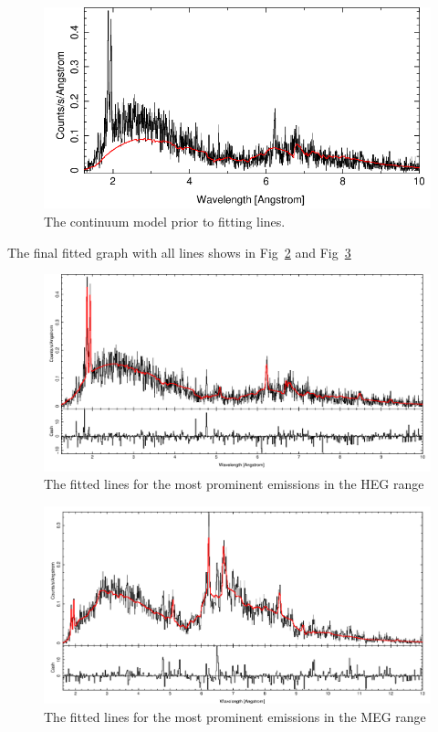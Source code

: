 \begin{figure}[h!]
    \centering
    \includegraphics[width=1\linewidth]{Chapters/Figures/unfitted.png}
    \caption{The continuum model prior to fitting lines.}
    \label{fig:continuum}
\end{figure}

The final fitted graph with all lines shows in Fig~\ref{fig:all_lines_1} and Fig~\ref{fig:all_lines_2}

\begin{figure}[h!]
    \centering
    \includegraphics[width=1\linewidth]{Chapters/Figures/all_lines_fitted_heg.png}
    \caption{The fitted lines for the most prominent emissions in the HEG range}
    \label{fig:all_lines_1}
\end{figure}

\begin{figure}[h!]
    \centering
    \includegraphics[width=1\linewidth]{Chapters/Figures/all_lines_fitted_meg.png}
    \caption{The fitted lines for the most prominent emissions in the MEG range}
    \label{fig:all_lines_2}
\end{figure}

